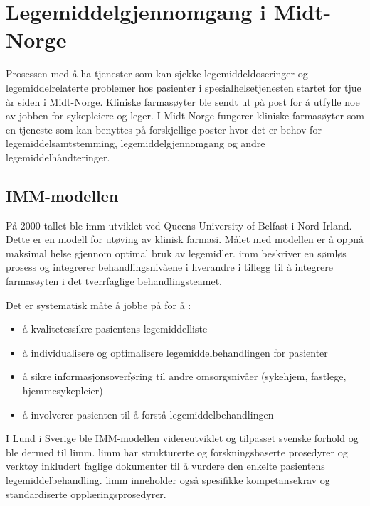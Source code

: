 \section{Legemiddelgjennomgang i Midt-Norge}
Prosessen med å ha tjenester som kan sjekke legemiddeldoseringer og legemiddelrelaterte problemer hos pasienter i spesialhelsetjenesten startet for tjue år siden i Midt-Norge. Kliniske farmasøyter ble sendt ut på post for å utfylle noe av jobben for sykepleiere og leger. I Midt-Norge fungerer kliniske farmasøyter som en tjeneste som kan benyttes på forskjellige poster hvor det er behov for legemiddelsamtstemming, legemiddelgjennomgang og andre legemiddelhåndteringer. 

\subsection{IMM-modellen}
På 2000-tallet ble \gls{imm} utviklet ved Queens University of Belfast i Nord-Irland. Dette er en modell for utøving av klinisk farmasi. Målet med modellen er å oppnå maksimal helse gjennom optimal bruk av legemidler.  \gls{imm} beskriver en sømløs prosess og integrerer behandlingsnivåene i hverandre i tillegg til
å integrere farmasøyten i det tverrfaglige behandlingsteamet. 

Det er systematisk måte å jobbe på for å :
\begin{itemize}
\item å kvalitetessikre pasientens legemiddelliste
\item å individualisere og optimalisere legemiddelbehandlingen for pasienter
\item å sikre informasjonsoverføring til andre omsorgsnivåer (sykehjem, fastlege, hjemmesykepleier)
\item å involverer pasienten til å forstå legemiddelbehandlingen
\end{itemize}
I Lund i Sverige ble IMM-modellen videreutviklet og tilpasset svenske forhold og ble dermed til \gls{limm}. \gls{limm} har strukturerte og forskningsbaserte prosedyrer og verktøy inkludert faglige dokumenter til å vurdere den enkelte pasientens legemiddelbehandling. \gls{limm} inneholder også spesifikke kompetansekrav og standardiserte opplæringsprosedyrer. 

